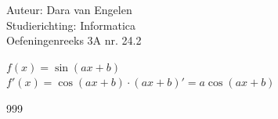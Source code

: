\documentclass[a4paper]{article}
\begin{document}
  
\noindent \large Auteur: Dara van Engelen\\
\noindent \large Studierichting: Informatica\\
\noindent \large Oefeningenreeks 3A nr. 24.2\\

\medskip

\normalsize

$f(x) = \sin\left( ax+b \right)$\\

$f'(x) = \cos\left( ax+b \right)\cdot (ax+b)' = a\cos\left( ax+b\right)$\\


\begin{thebibliography}{999}
\end{thebibliography}
\end{document}
